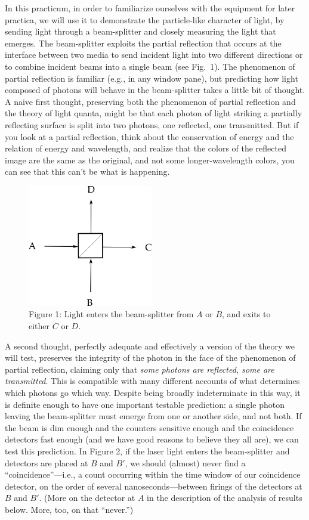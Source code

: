 In this practicum, in order to familiarize ourselves with the equipment for later practica, we will use it to demonstrate the particle-like character of light, by sending light through a beam-splitter and closely measuring the light that emerges. The beam-splitter exploits the partial reflection that occurs at the interface between two media to send incident light into two different directions or to combine incident beams into a single beam (see Fig.\ 1). The phenomenon of partial reflection is familiar (e.g., in any window pane), but predicting how light composed of photons will behave in the beam-splitter takes a little bit of thought. A naive first thought, preserving both the phenomenon of partial reflection and the theory of light quanta, might be that each photon of light striking a partially reflecting surface is split into two photons, one reflected, one transmitted. But if you look at a partial reflection, think about the conservation of energy and the relation of energy and wavelength, and realize that the colors of the reflected image are the same as the original, and not some longer-wavelength colors, you can see that this can't be what is happening.

\begin{figure}[h] 
  \centering
      \captionsetup{width=.75\textwidth}
    \includegraphics[width=2.15in,height=2.09333in]{images/13_optics-lab/beam-splitter.png}
    \caption*{Figure 1: Light enters the beam-splitter from $A$ or $B$, and exits to either $C$ or $D$.}
\end{figure}

A second thought, perfectly adequate and effectively a version of the theory we will test, preserves the integrity of the photon in the face of the phenomenon of partial reflection, claiming only that \emph{some photons are reflected, some are transmitted}. This is compatible with many different accounts of what determines which photons go which way. Despite being broadly indeterminate in this way, it is definite enough to have one important testable prediction: a single photon leaving the beam-splitter must emerge from one or another side, and not both. If the beam is dim enough and the counters sensitive enough and the coincidence detectors fast enough (and we have good reasons to believe they all are), we can test this prediction. In Figure 2, if the laser light enters the beam-splitter and detectors are placed at $B$ and $B'$, we should (almost) never find a ``coincidence''---i.e., a count occurring within the time window of our coincidence detector, on the order of several nanoseconds---between firings of the detectors at $B$ and $B'$. (More on the detector at $A$ in the description of the analysis of results below. More, too, on that ``never.'')

